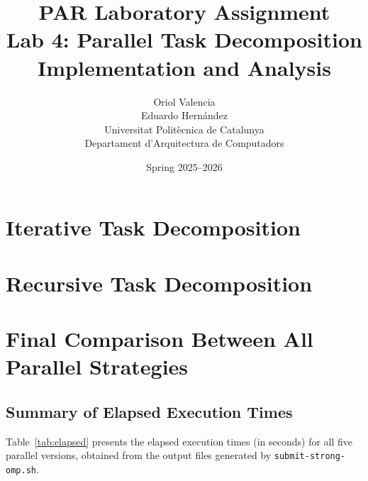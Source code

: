 \documentclass[12pt,a4paper]{report}
\title{%
    \textbf{PAR Laboratory Assignment}\\[0.4em]
    \large Lab 4: Parallel Task Decomposition\\
    Implementation and Analysis%
}
\author{%
    Oriol Valencia\\[0.4em]
    Eduardo Hernández\\[0.4em]
    \small Universitat Polit\`{e}cnica de Catalunya\\
    \small Departament d'Arquitectura de Computadors%
}
\date{Spring 2025--2026}
\begin{document}
\maketitle
\tableofcontents
\newpage

\chapter{Iterative Task Decomposition}


\clearpage

\clearpage

\chapter{Recursive Task Decomposition}


\clearpage

\clearpage

\clearpage

\appendix
\chapter{Final Comparison Between All Parallel Strategies}

\section{Summary of Elapsed Execution Times}
\label{app:comparison}

Table~\ref{tab:elapsed} presents the elapsed execution times (in seconds) for all five
parallel versions, obtained from the output files generated by \texttt{submit-strong-omp.sh}.
\end{document}
